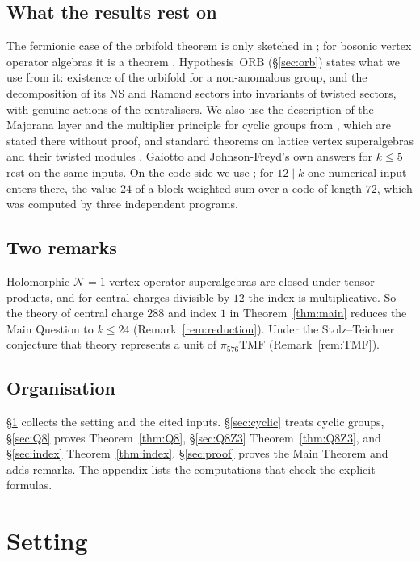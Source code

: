 \documentclass[11pt]{amsart}
\theoremstyle{definition}
\newcommand{\cN}{\mathcal N}
\begin{document}
\subsection*{What the results rest on}
The fermionic case of the orbifold theorem \cite[Thm.~4.2]{GJF} is only sketched in \cite{GJF}; for
bosonic vertex operator algebras it is a theorem \cite{Kirillov,DNR,McRae}. Hypothesis~ORB
(\S\ref{sec:orb}) states what we use from it: existence of the orbifold for a non-anomalous group, and
the decomposition of its NS and Ramond sectors into invariants of twisted sectors, with genuine actions
of the centralisers. We also use the description of the Majorana layer and the multiplier principle for
cyclic groups from \cite[\S4]{GJF}, which are stated there without proof, and standard theorems on lattice
vertex superalgebras and their twisted modules \cite{BK,Li,DZ,DRY}. Gaiotto and Johnson-Freyd's own
answers for $k\le5$ rest on the same inputs. On the code side we use \cite{I}; for $12\mid k$ one
numerical input enters there, the value $24$ of a block-weighted sum over a code of length $72$, which
was computed by three independent programs.

\subsection*{Two remarks}
Holomorphic $\cN=1$ vertex operator superalgebras are closed under tensor products, and for central
charges divisible by $12$ the index is multiplicative. So the theory of central charge $288$ and index
$1$ in Theorem~\ref{thm:main} reduces the Main Question to $k\le24$ (Remark~\ref{rem:reduction}). Under
the Stolz--Teichner conjecture that theory represents a unit of $\pi_{576}\mathrm{TMF}$
(Remark~\ref{rem:TMF}).

\subsection*{Organisation}
\S\ref{sec:setting} collects the setting and the cited inputs. \S\ref{sec:cyclic} treats cyclic groups,
\S\ref{sec:Q8} proves Theorem~\ref{thm:Q8}, \S\ref{sec:Q8Z3} Theorem~\ref{thm:Q8Z3}, and
\S\ref{sec:index} Theorem~\ref{thm:index}. \S\ref{sec:proof} proves the Main Theorem and adds remarks.
The appendix lists the computations that check the explicit formulas.

\section{Setting}\label{sec:setting}
\end{document}
